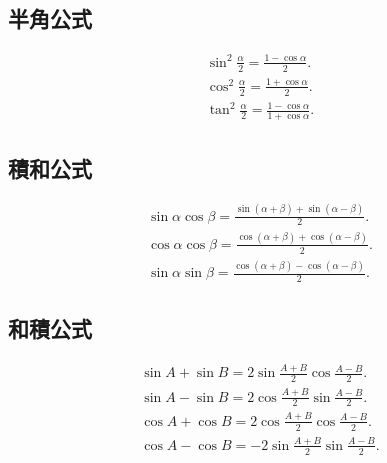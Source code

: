         \subsection{半角公式}
            \begin{align}
                \sin^{2}\frac{\alpha}{2}=\frac{1-\cos\alpha}{2}. \\
                \cos^{2}\frac{\alpha}{2}=\frac{1+\cos\alpha}{2}. \\
                \tan^{2}\frac{\alpha}{2}=\frac{1-\cos\alpha}{1+\cos\alpha}.
            \end{align}

        \subsection{積和公式}
            \begin{align}
                \sin\alpha\cos\beta=\frac{\sin(\alpha+\beta)+\sin(\alpha-\beta)}{2}. \\
                \cos\alpha\cos\beta=\frac{\cos(\alpha+\beta)+\cos(\alpha-\beta)}{2}. \\
                \sin\alpha\sin\beta=\frac{\cos(\alpha+\beta)-\cos(\alpha-\beta)}{2}.
            \end{align}

        \subsection{和積公式}
            \begin{align}
                \sin{A}+\sin{B}=2 \sin\frac{A+B}{2}\cos\frac{A-B}{2}. \\
                \sin{A}-\sin{B}=2 \cos\frac{A+B}{2}\sin\frac{A-B}{2}. \\
                \cos{A}+\cos{B}=2 \cos\frac{A+B}{2}\cos\frac{A-B}{2}. \\
                \cos{A}-\cos{B}=-2 \sin\frac{A+B}{2}\sin\frac{A-B}{2}.
            \end{align}
